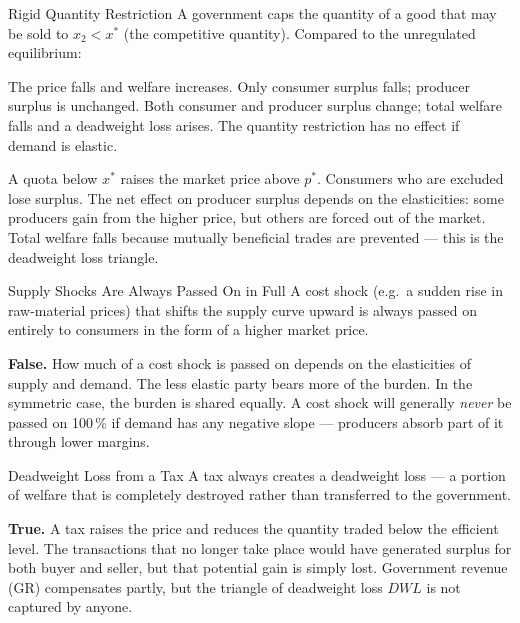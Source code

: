 \documentclass[paper=a5]{scrartcl}
\begin{document}
\begin{question}[type=mc]{Rigid Quantity Restriction}
A government caps the quantity of a good that may be sold to $x_2 < x^*$
(the competitive quantity). Compared to the unregulated equilibrium:
\begin{choices}
  \choice        The price falls and welfare increases.
  \choice        Only consumer surplus falls; producer surplus is unchanged.
  \correctchoice Both consumer and producer surplus change; total welfare falls
                 and a deadweight loss arises.
  \choice        The quantity restriction has no effect if demand is elastic.
\end{choices}
\begin{solution}
  A quota below $x^*$ raises the market price above $p^*$. Consumers who are
  excluded lose surplus. The net effect on producer surplus depends on the
  elasticities: some producers gain from the higher price, but others are
  forced out of the market. Total welfare falls because mutually beneficial
  trades are prevented — this is the deadweight loss triangle.
\end{solution}
\end{question}

\begin{question}[type=tf]{Supply Shocks Are Always Passed On in Full}
A cost shock (e.g.\ a sudden rise in raw-material prices) that shifts the
supply curve upward is always passed on entirely to consumers in the form
of a higher market price.
\truefalse[false]
\begin{solution}
  \textbf{False.} How much of a cost shock is passed on depends on the
  elasticities of supply and demand. The less elastic party bears more of
  the burden. In the symmetric case, the burden is shared equally. A cost
  shock will generally \emph{never} be passed on 100\,\% if demand has any
  negative slope — producers absorb part of it through lower margins.
\end{solution}
\end{question}

\begin{question}[type=tf]{Deadweight Loss from a Tax}
A tax always creates a deadweight loss — a portion of welfare that is
completely destroyed rather than transferred to the government.
\truefalse[true]
\begin{solution}
  \textbf{True.} A tax raises the price and reduces the quantity traded below
  the efficient level. The transactions that no longer take place would have
  generated surplus for both buyer and seller, but that potential gain is
  simply lost. Government revenue (GR) compensates partly, but the triangle
  of deadweight loss $DWL$ is not captured by anyone.
\end{solution}
\end{question}
\end{document}

